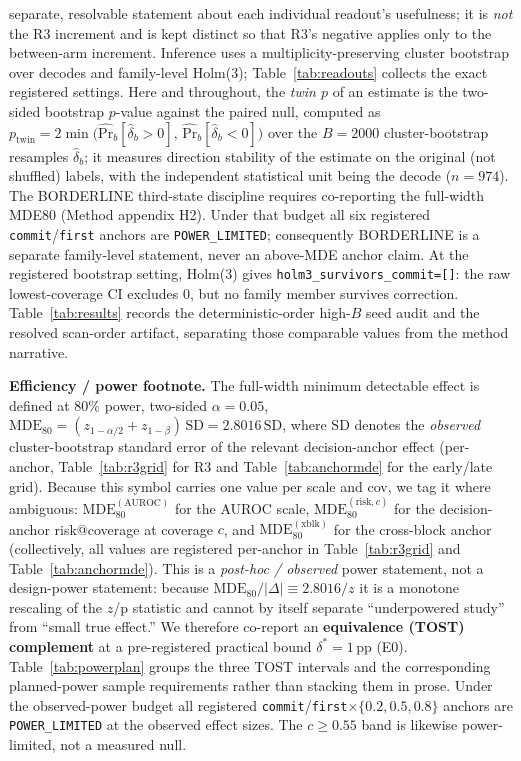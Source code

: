 \documentclass{article}
\begin{document}
separate, resolvable statement about each individual readout's usefulness; it is \emph{not} the R3
increment and is kept distinct so that R3's negative applies only to the between-arm increment.
Inference uses a multiplicity-preserving cluster bootstrap over decodes and family-level Holm(3);
Table~\ref{tab:readouts} collects the exact registered settings. Here and throughout, the \emph{twin $p$} of an
estimate is the two-sided bootstrap $p$-value against the paired null, computed as
$p_{\mathrm{twin}}=2\min\big(\widehat{\mathrm{Pr}}_b[\hat\delta_b>0],\,
\widehat{\mathrm{Pr}}_b[\hat\delta_b<0]\big)$ over the $B{=}2000$ cluster-bootstrap
resamples $\hat\delta_b$; it measures direction stability of the estimate on the original
(not shuffled) labels, with the independent statistical unit being the decode ($n{=}974$). The BORDERLINE third-state discipline requires
co-reporting the full-width MDE80 (Method appendix H2). Under that budget all six registered
\texttt{commit}/\texttt{first} anchors are \texttt{POWER\_LIMITED}; consequently
BORDERLINE is a separate family-level statement, never an above-MDE anchor claim. At the
registered bootstrap setting, Holm(3) gives \texttt{holm3\_survivors\_commit=[]}: the raw
lowest-coverage CI excludes 0, but no family member survives correction. Table~\ref{tab:results}
records the deterministic-order high-$B$ seed audit and the resolved scan-order artifact,
separating those comparable values from the method narrative.

\textbf{Efficiency / power footnote.} The full-width minimum detectable effect is defined at
80\% power, two-sided $\alpha{=}0.05$,
$\mathrm{MDE}_{80}=(z_{1-\alpha/2}+z_{1-\beta})\,\mathrm{SD}=2.8016\,\mathrm{SD}$, where
$\mathrm{SD}$ denotes the \emph{observed} cluster-bootstrap standard error of the relevant
decision-anchor effect (per-anchor, Table~\ref{tab:r3grid} for R3 and
Table~\ref{tab:anchormde} for the early/late grid). Because this symbol carries
one value per scale and cov, we tag it where ambiguous: $\mathrm{MDE}_{80}^{(\mathrm{AUROC})}$
for the AUROC scale, $\mathrm{MDE}_{80}^{(\mathrm{risk},c)}$ for the decision-anchor
risk@coverage at coverage $c$, and $\mathrm{MDE}_{80}^{\mathrm{(xblk)}}$ for the cross-block
anchor (collectively, all values are registered per-anchor in Table~\ref{tab:r3grid} and
Table~\ref{tab:anchormde}). This is a
\emph{post-hoc / observed} power statement, not a design-power statement: because
$\mathrm{MDE}_{80}/|\Delta|\equiv2.8016/z$ it is a monotone rescaling of the $z$/p statistic and
cannot by itself separate ``underpowered study'' from ``small true effect.'' We therefore
co-report an \textbf{equivalence (TOST) complement} at a pre-registered practical bound
$\delta^*{=}1$\,pp (E0). Table~\ref{tab:powerplan} groups the three TOST intervals and the
corresponding planned-power sample requirements rather than stacking them in prose. Under the observed-power budget all
registered \texttt{commit}/\texttt{first}$\times\{0.2,0.5,0.8\}$ anchors are
\texttt{POWER\_LIMITED} at the observed effect sizes. The $c\ge0.55$ band is likewise
power-limited, not a measured null.
\end{document}
